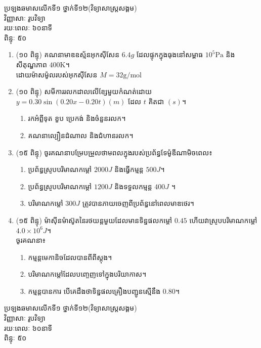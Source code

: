 \documentclass{classes/exam}
\begin{document}
	\begin{center}
		{\kml ប្រឡងឆមាសលើកទី១ ថ្នាក់ទី១២(វិទ្យាសាស្រ្តសង្គម)\\
		វិញ្ញាសាៈ រូបវិទ្យា\\
		រយៈពេលៈ ៦០នាទី\\
		ពិន្ទុៈ ៥០}
	\end{center}
	\begin{enumerate}[I]
		\item {\color{magenta}\ks (១០ ពិន្ទុ)} គណនាមាឌឧស្ម័នអុកសុីសែន $6.4g$ ដែលផ្ទុកក្នុងធុងនៅសម្ពាធ $10^{5}\si{\pascal}$ និងសីតុណ្ហភាព $400\si{\kelvin}$។
		\\ដោយម៉ាសម៉ូលរបស់អុកសុីសែន $M=32\si{\gram/\mole}$
		\item {\color{magenta}\ks (១០ ពិន្ទុ)} សមីការរលកដាលលើខ្សែមួយកំណត់ដោយ $y=0.30\sin\left(0.20x-0.20t\right)\left(m\right)$ ដែល $t$ គិតជា $(s)$។
		\begin{enumerate}[k]
			\item រកអំព្លីទុត ខួប ប្រេកង់ និងចំនួនរលក។
			\item គណនាល្បឿនដំណាល និងជំហានរលក។
		\end{enumerate}
		\item {\color{magenta}\ks (១៥ ពិន្ទុ)} ចូរគណនាបម្រែបម្រួលថាមពលក្នុងរបស់ប្រព័ន្ធទែម៉ូឌីណាមិចពេល៖
		\begin{enumerate}[k]
			\item ប្រព័ន្ធស្រូបបរិមាណកម្តៅ $2000J$ និងធ្វើកម្មន្ត $500J$។
			\item ប្រព័ន្ធស្រូបបរិមាណកម្តៅ $1200J$ និងទទួលកម្មន្ត $400J$ ។
			\item បរិមាណកម្តៅ $300J$ ត្រូវបានភាយចេញពីប្រព័ន្ធនៅពេលមាឌថេរ។
		\end{enumerate}
		\item {\color{magenta}\ks (១៥ ពិន្ទុ)} ម៉ាសុីនម៉ាស៊ូតនៃរថយន្តមួយដែលមានទិន្នផលកម្តៅ $0.45$ ហើយវាស្រូបបរិមាណកម្តៅ $4.0\times 10^{6}J$។\\ 
		ចូរគណនា៖
		\begin{enumerate}[k]
			\item កម្មន្តមេកានិចដែលបានពីពីស្តុង។
			\item បរិមាណកម្តៅដែលបញ្ចេញទៅក្នុងបរិយាកាស។
			\item កម្មន្តបានការ បើគេដឹងថាទិន្នផលគ្រឿងបញ្ជូនស្មើនឹង $0.80$។
		\end{enumerate}
	\end{enumerate}
\newpage
\begin{center}
	{\kml ប្រឡងឆមាសលើកទី១ ថ្នាក់ទី១២(វិទ្យាសាស្រ្តសង្គម)\\
		វិញ្ញាសាៈ រូបវិទ្យា\\
		រយៈពេលៈ ៦០នាទី\\
		ពិន្ទុៈ ៥០}
\end{center}
\end{document}
